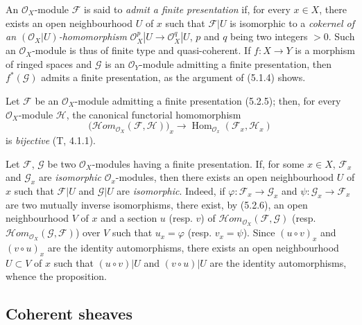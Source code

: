 \begin{env}[5.2.5]
\label{0.5.2.5}
An $\mathcal{O}_X$-module $\mathcal{F}$ is said to \emph{admit a finite
presentation} if, for every $x\in X$, there exists an open neighbourhood $U$ of $x$ such
that $\mathcal{F}|U$ is isomorphic to a \emph{cokernel of an
$(\mathcal{O}_X|U)$-homomorphism}
$\mathcal{O}_X^p|U\to\mathcal{O}_X^q|U$, $p$ and $q$ being two integers $>0$.
Such an $\mathcal{O}_X$-module is thus of finite type and quasi-coherent. If
$f:X\to Y$ is a morphism of ringed spaces and $\mathcal{G}$ is an
$\mathcal{O}_Y$-module admitting a finite presentation, then
$f^*(\mathcal{G})$ admits a finite presentation, as the
argument of (5.1.4) shows.
\end{env}

\begin{env}[5.2.6]
\label{0.5.2.6}
Let $\mathcal{F}$ be an $\mathcal{O}_X$-module admitting a finite presentation
(5.2.5); then, for every $\mathcal{O}_X$-module $\mathcal{H}$,
the canonical functorial homomorphism
\[
  \bigl(\mathcal{H}\!om_{\mathcal{O}_X}(\mathcal{F},\mathcal{H})\bigr)_x
  \longrightarrow
  \operatorname{Hom}_{\mathcal{O}_x}(\mathcal{F}_x,\mathcal{H}_x)
\]
is \emph{bijective} (T, 4.1.1).
\end{env}

\begin{env}[5.2.7]
\label{0.5.2.7}
Let $\mathcal{F}$, $\mathcal{G}$ be two $\mathcal{O}_X$-modules having a
finite presentation. If, for some $x\in X$, $\mathcal{F}_x$ and $\mathcal{G}_x$
are \emph{isomorphic} $\mathcal{O}_x$-modules, then there exists an open
neighbourhood $U$ of $x$ such that $\mathcal{F}|U$ and $\mathcal{G}|U$ are
\emph{isomorphic}. Indeed, if
$\varphi:\mathcal{F}_x\to\mathcal{G}_x$ and
$\psi:\mathcal{G}_x\to\mathcal{F}_x$ are two mutually inverse isomorphisms, there
exist, by (5.2.6), an open neighbourhood $V$ of $x$ and a section $u$
(resp. $v$) of
$\mathcal{H}\!om_{\mathcal{O}_X}(\mathcal{F},\mathcal{G})$ (resp.
$\mathcal{H}\!om_{\mathcal{O}_X}(\mathcal{G},\mathcal{F})$) over $V$
such
that $u_x=\varphi$ (resp. $v_x=\psi$). Since $(u\circ v)_x$ and
$(v\circ u)_x$ are the identity automorphisms, there exists an open
neighbourhood $U\subset V$ of $x$ such that $(u\circ v)|U$ and $(v\circ u)|U$ are the
identity automorphisms, whence the proposition.
\end{env}

\subsection{Coherent sheaves}
\label{subsection:0.5.3}

